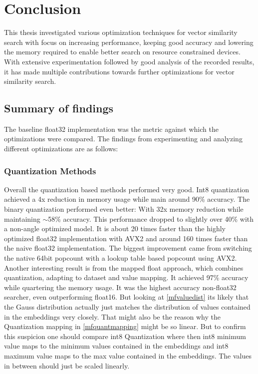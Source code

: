 \chapter{Conclusion}
\label{chapter:conclusion}
This thesis investigated various optimization techniques for vector similarity search with focus on increasing performance, keeping good accuracy and lowering the memory required to enable better search on resource constrained devices. With extensive experimentation followed by good analysis of the recorded results, it has made multiple contributions towards further optimizations for vector similarity search.

\section{Summary of findings}
The baseline float32 implementation was the metric against which the optimizations were compared. The findings from experimenting and analyzing different optimizations are as follows:

\subsection{Quantization Methods}
Overall the quantization based methods performed very good. Int8 quantization achieved a 4x reduction in memory usage while main around 90\% accuracy.
The binary quantization performed even better: With 32x memory reduction while maintaining $\sim$58\% accuracy. This performance dropped to slightly over 40\% with a non-angle optimized model.
It is about 20 times faster than the highly optimized float32 implementation with AVX2 and around 160 times faster than the naive float32 implementation. The biggest improvement came from switching the native 64bit popcount with a lookup table based popcount using AVX2. Another interesting result is from the mapped float approach, which combines quantization, adapting to dataset and value mapping. It achieved 97\% accuracy while quartering the memory usage. It was the highest accuracy non-float32 searcher, even outperforming float16.
But looking at \autoref{mfvaluedist} its likely that the Gauss distribution actually just matches the distribution of values contained in the embeddings very closely. That might also be the reason why the Quantization mapping in \autoref{mfquantmapping} might be so linear. But to confirm this suspicion one should compare int8 Quantization where then int8 minimum value maps to the minimum values contained in the embeddings and int8 maximum value maps to the max value contained in the  embeddings. The values in between should just be scaled linearly.

